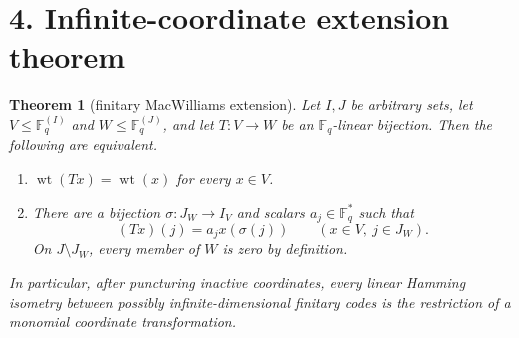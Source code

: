 \documentclass[11pt]{article}
\newtheorem{theorem}{Theorem}
\newcommand{\F}{\mathbb F}
\newcommand{\wt}{\operatorname{wt}}
\begin{document}
\section*{4. Infinite-coordinate extension theorem}

\begin{theorem}[finitary MacWilliams extension]\label{thm:main}
Let $I,J$ be arbitrary sets, let $V\leq\F_q^{(I)}$ and
$W\leq\F_q^{(J)}$, and let $T:V\to W$ be an $\F_q$-linear bijection.  Then
the following are equivalent.
\begin{enumerate}
\item $\wt(Tx)=\wt(x)$ for every $x\in V$.
\item There are a bijection $\sigma:J_W\to I_V$ and scalars
      $a_j\in\F_q^*$ such that
      \begin{equation}\label{eq:monomial}
        (Tx)(j)=a_jx(\sigma(j))
        \qquad(x\in V,\ j\in J_W).
      \end{equation}
      On $J\setminus J_W$, every member of $W$ is zero by definition.
\end{enumerate}
In particular, after puncturing inactive coordinates, every linear Hamming
isometry between possibly infinite-dimensional finitary codes is the
restriction of a monomial coordinate transformation.
\end{theorem}
\end{document}
